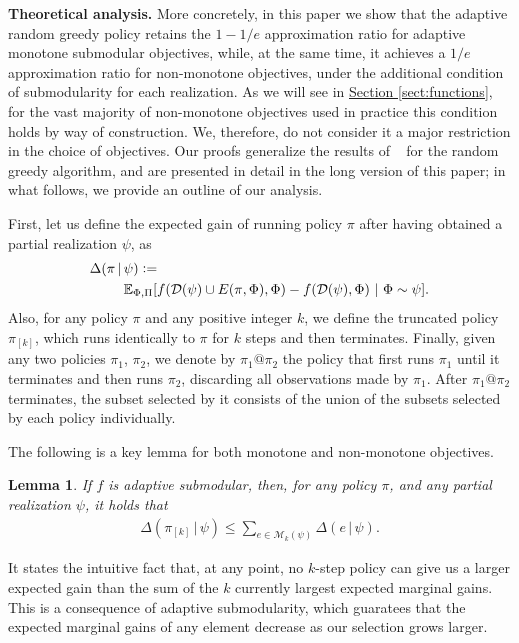 \documentclass{article}
\newcommand{\sectref}[1]{\hyperref[#1]{Section \ref*{#1}}}
\newtheorem{lemma}{Lemma}
\newcommand{\defeq}{\vcentcolon=}
\newcommand{\mmid}{\,\vert\,}
\newcommand{\D}[2]{\Delta(#1\mmid#2)}
\newcommand{\pik}{\pi_{[k]}}
\newcommand{\dom}{\mathcal{D}}
\newcommand{\Mk}{\mathcal{M}_k}
\newcommand{\citet}[1]{\citeauthor{#1}~\shortcite{#1}}
\renewcommand{\paragraph}[1]{\vspace{0.3em}\noindent\textbf{#1.}\makebox[0.5em]{}}
\begin{document}
\paragraph{Theoretical analysis}
More concretely, in this paper we show that the adaptive random greedy policy retains the $1-1/e$ approximation ratio for adaptive monotone submodular objectives, while, at the same time, it achieves a $1/e$ approximation ratio for non-monotone objectives, under the additional condition of submodularity for each realization.
As we will see in \sectref{sect:functions}, for the vast majority of non-monotone objectives used in practice this condition holds by way of construction.
We, therefore, do not consider it a major restriction in the choice of objectives.
Our proofs generalize the results of \citet{buchbinder14} for the random greedy algorithm, and are presented in detail in the long version of this paper; in what follows, we provide an outline of our analysis.

First, let us define the expected gain of running policy $\pi$ after having obtained a partial realization $\psi$, as
{\small
\begin{align*}
  \D{\pi}{&\psi} \defeq \\
          &\E[\Phi,\Pi]{f(\dom(\psi) \cup E(\pi, \Phi), \Phi) - f(\dom(\psi), \Phi)}[\Phi \sim \psi].
\end{align*}}
Also, for any policy $\pi$ and any positive integer $k$, we define the truncated policy $\pik$, which runs identically to $\pi$ for $k$ steps and then terminates.
Finally, given any two policies $\pi_1$, $\pi_2$, we denote by $\pi_1@\pi_2$ the policy that first runs $\pi_1$ until it terminates and then runs $\pi_2$, discarding all observations made by $\pi_1$.
After $\pi_1@\pi_2$ terminates, the subset selected by it consists of the union of the subsets selected by each policy individually.

The following is a key lemma for both monotone and non-monotone objectives.
\setcounter{lemma}{0}
\begin{lemma}\label{lem:submod}
  If $f$ is adaptive submodular, then, for any policy $\pi$, and any partial realization $\psi$, it holds that
  \begin{align*}
    \D{\pik}{\psi} \leq \sum_{e \in \Mk(\psi)} \D{e}{\psi}.
  \end{align*}
\end{lemma}
\noindent 
It states the intuitive fact that, at any point, no $k$-step policy can give us a larger expected gain than the sum of the $k$ currently largest expected marginal gains.
This is a consequence of adaptive submodularity, which guaratees that the expected marginal gains of any element decrease as our selection grows larger.
\end{document}
